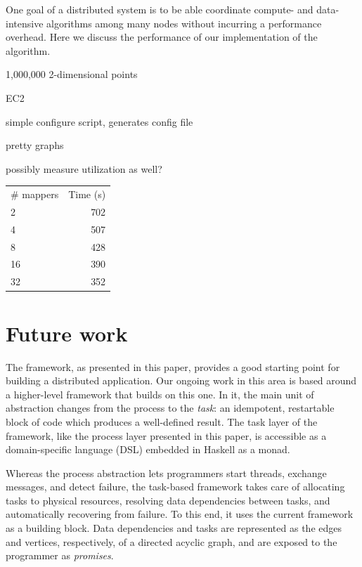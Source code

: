 \documentclass[preprint]{sigplanconf}
\begin{document}
One goal of a distributed system is to be able coordinate compute- and data-intensive algorithms among many nodes without incurring a performance overhead. Here we discuss the performance of our implementation of the \kmeans algorithm.

1,000,000 2-dimensional points

EC2

simple configure script, generates config file

pretty graphs

possibly measure utilization as well?

\begin{center}
\begin{table}[h]

\begin{tabular}{l r}
\hline
  \# mappers & Time (s) \\
  2 & 702 \\
  4 & 507 \\
  8 & 428 \\
  16 & 390 \\
  32 & 352 \\
\hline
\end{tabular}
\end{table}
\end{center}


\section{Future work}
The framework, as presented in this paper, provides a good starting point for building a distributed application. Our ongoing work in this area is based around a higher-level framework that builds on this one. In it, the main unit of abstraction changes from the process to the {\em task}: an idempotent, restartable block of code which produces a well-defined result. The task layer of the framework, like the process layer presented in this paper, is accessible as a domain-specific language (DSL) embedded in Haskell as a monad.

Whereas the process abstraction lets programmers start threads, exchange messages, and detect failure, the task-based framework takes care of allocating tasks to physical resources, resolving data dependencies between tasks, and automatically recovering from failure. To this end, it uses the current framework as a building block. Data dependencies and tasks are represented as the edges and vertices, respectively, of a directed acyclic graph, and are exposed to the programmer as {\em promises}.
\end{document}
